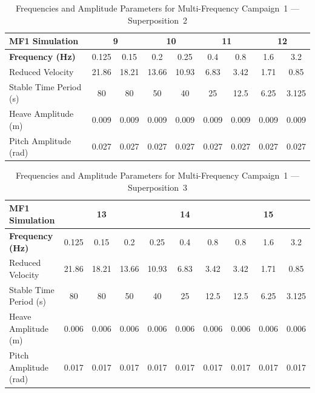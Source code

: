 \documentclass[../main]{subfiles}
\begin{document}
\begin{table}[htbp]
\centering
\caption{Frequencies and Amplitude Parameters for Multi-Frequency Campaign~1 --- Superposition~2}
\label{tab:MF1_SP2}
\begin{tabular}{|l|cc|cc|cc|cc|}
\hline
\rule{0pt}{12pt}\textbf{MF1 Simulation} & \multicolumn{2}{c|}{9} & \multicolumn{2}{c|}{10} & \multicolumn{2}{c|}{11} & \multicolumn{2}{c|}{12} \\[4pt]
\hline
\rule{0pt}{12pt}\textbf{Frequency (Hz)} & 0.125 & 0.15 & 0.2 & 0.25 & 0.4 & 0.8 & 1.6 & 3.2 \\[4pt]
\hline
Reduced Velocity        & 21.86 & 18.21 & 13.66 & 10.93 & 6.83 & 3.42 & 1.71 & 0.85 \\
Stable Time Period (s)  & 80    & 80    & 50    & 40    & 25   & 12.5 & 6.25 & 3.125 \\
Heave Amplitude (m)     & 0.009 & 0.009 & 0.009 & 0.009 & 0.009 & 0.009 & 0.009 & 0.009 \\
Pitch Amplitude (rad)   & 0.027 & 0.027 & 0.027 & 0.027 & 0.027 & 0.027 & 0.027 & 0.027 \\
\hline
\end{tabular}
\end{table}

\begin{table}[htbp]
\centering
\caption{Frequencies and Amplitude Parameters for Multi-Frequency Campaign~1 --- Superposition~3}
\label{tab:MF1_SP3}
\begin{tabular}{|l|ccc|ccc|ccc|}
\hline
\rule{0pt}{12pt}\textbf{MF1 Simulation} & \multicolumn{3}{c|}{13} & \multicolumn{3}{c|}{14} & \multicolumn{3}{c|}{15} \\[4pt]
\hline
\rule{0pt}{12pt}\textbf{Frequency (Hz)} & 0.125 & 0.15 & 0.2 & 0.25 & 0.4 & 0.8 & 0.8 & 1.6 & 3.2 \\[4pt]
\hline
Reduced Velocity        & 21.86 & 18.21 & 13.66 & 10.93 & 6.83 & 3.42 & 3.42 & 1.71 & 0.85 \\
Stable Time Period (s)  & 80    & 80    & 50    & 40    & 25   & 12.5 & 12.5 & 6.25 & 3.125 \\
Heave Amplitude (m)     & 0.006 & 0.006 & 0.006 & 0.006 & 0.006 & 0.006 & 0.006 & 0.006 & 0.006 \\
Pitch Amplitude (rad)   & 0.017 & 0.017 & 0.017 & 0.017 & 0.017 & 0.017 & 0.017 & 0.017 & 0.017 \\
\hline
\end{tabular}
\end{table}
\end{document}
